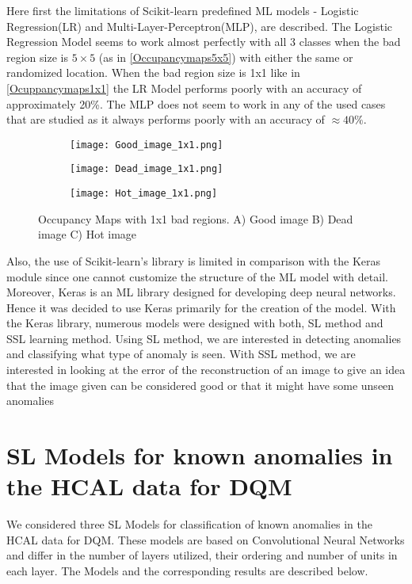 Here first the limitations of Scikit-learn predefined ML models - Logistic Regression(LR) and Multi-Layer-Perceptron(MLP), are described. The Logistic Regression Model seems to work almost perfectly with all 3 classes when the bad region size is $5\times5$ (as in \autoref{Occupancymaps5x5}) with either the same or randomized location. When the bad region size is 1x1 like in \autoref{Ocuppancymaps1x1} the LR Model performs poorly with an accuracy of approximately 20\%.
 The MLP does not seem to work in any of the used cases that are studied as it always performs poorly with an accuracy of $\approx 40\%$.

\begin{figure}[h]
\centering
\begin{subfigure}[t]{.316\textwidth}
\texttt{[image: Good\_image\_1x1.png]}
\caption{}
\end{subfigure}
\begin{subfigure}[t]{.305\textwidth}
\texttt{[image: Dead\_image\_1x1.png]}
\caption{}
\end{subfigure}
\begin{subfigure}[t]{.3\textwidth}
\texttt{[image: Hot\_image\_1x1.png]}
\caption{}
\end{subfigure}
\vspace{5mm}
\caption{Occupancy Maps with 1x1 bad regions. A) Good image B) Dead image C) Hot image\label{Ocuppancymaps1x1}}
\end{figure}

Also, the use of Scikit-learn’s library is limited in comparison with the Keras module since one cannot customize the structure of the ML model with detail. Moreover, Keras is an ML library designed for developing deep neural networks. Hence it was decided to use Keras primarily for the creation of the model.
 With the Keras library, numerous models were designed with both, SL method and SSL learning method. Using SL method, we are interested in detecting anomalies and classifying what type of anomaly is seen. With SSL method, we are interested in looking at the error of the reconstruction of an image to give an idea that the image given can be considered good or that it might have some unseen anomalies

\section{SL Models for known anomalies in the HCAL data for DQM}
We considered three SL Models for classification of known anomalies in the HCAL data for DQM. 
These models are based on Convolutional Neural Networks and differ in the number of layers utilized, their ordering and number of units in each layer. The Models and the corresponding results are described below.


